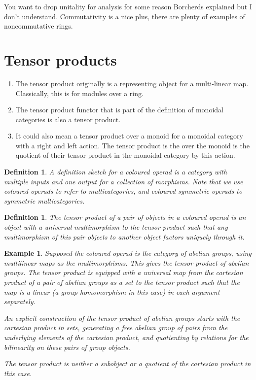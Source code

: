 \documentclass{tufte-book}
\newtheorem{definition}[theorem]{Definition}
\newtheorem{example}[theorem]{Example}
\begin{document}
You want to drop unitality for analysis for some reason Borcherds explained but I don't understand. Commutativity is a nice plus, there are plenty of examples of noncommutative rings.

\section{Tensor products}

\begin{enumerate}
  \item The tensor product originally is a representing object for a multi-linear map. Classically, this is for modules over a ring.
  \item The tensor product functor that is part of the definition of monoidal categories is also a tensor product.
  \item It could also mean a tensor product over a monoid for a monoidal category with a right and left action. The tensor product is the over the monoid is the quotient of their tensor product in the monoidal category by this action.
\end{enumerate}

\begin{definition}
  A definition sketch for a coloured operad is a category with multiple inputs and one output for a collection of morphisms. Note that we use coloured operads to refer to multicategories, and coloured symmetric operads to symmetric multicategories.
\end{definition}

\begin{definition}
  The tensor product of a pair of objects in a coloured operad is an object with a universal multimorphism to the tensor product such that any multimorphism of this pair objects to another object factors uniquely through it.
\end{definition}

\begin{example}
  Supposed the coloured operad is the category of abelian groups, using multilinear maps as the multimorphisms. This gives the tensor product of abelian groups. The tensor product is equipped with a universal map from the cartesian product of a pair of abelian groups as a set to the tensor product such that the map is a linear (a group homomorphism in this case) in each argument separately.

  An explicit construction of the tensor product of abelian groups starts with the cartesian product in sets, generating a free abelian group of pairs from the underlying elements of the cartesian product, and quotienting by relations for the bilinearity on these pairs of group objects.
  
  The tensor product is neither a subobject or a quotient of the cartesian product in this case.
\end{example}
\end{document}
